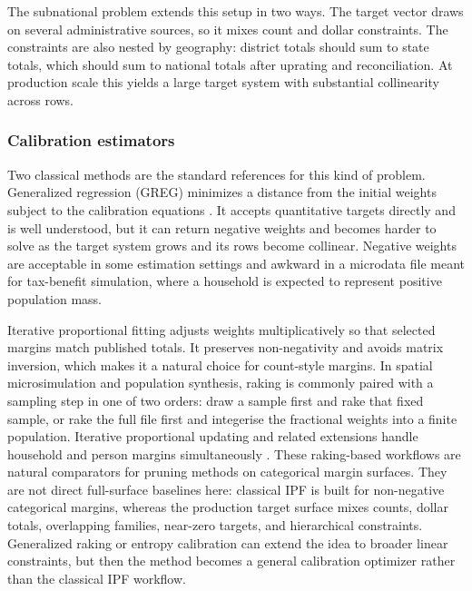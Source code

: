 The subnational problem extends this setup in two ways. The target vector draws on several
administrative sources, so it mixes count and dollar constraints. The constraints are also nested by
geography: district totals should sum to state totals, which should sum to national totals after
uprating and reconciliation. At production scale this yields a large target system with substantial
collinearity across rows.

\subsubsection{Calibration estimators}

Two classical methods are the standard references for this kind of problem. Generalized regression
(GREG) minimizes a distance from the initial weights subject to the calibration equations
\citep{deville1992, sarndal2007}. It accepts quantitative targets directly and is well understood,
but it can return negative weights and becomes harder to solve as the target system grows and its
rows become collinear. Negative weights are acceptable in some estimation settings and awkward in a
microdata file meant for tax-benefit simulation, where a household is expected to represent positive
population mass.

Iterative proportional fitting \citep[IPF, or raking;][]{deming1940, ireland1968} adjusts weights
multiplicatively so that selected margins match published totals. It preserves non-negativity and
avoids matrix inversion, which makes it a natural choice for count-style margins. In spatial
microsimulation and population synthesis, raking is commonly paired with a sampling step in one of two
orders: draw a sample first and rake that fixed sample, or rake the full file first and integerise the
fractional weights into a finite population. Iterative proportional updating and related extensions
handle household and person margins simultaneously \citep{pritchard2012}. These raking-based workflows
are natural comparators for pruning methods on categorical margin surfaces. They are not direct
full-surface baselines here: classical IPF is built for non-negative categorical margins, whereas the
production target surface mixes counts, dollar totals, overlapping families, near-zero targets, and
hierarchical constraints. Generalized raking or entropy calibration can extend the idea to broader
linear constraints, but then the method becomes a general calibration optimizer rather than the
classical IPF workflow.

